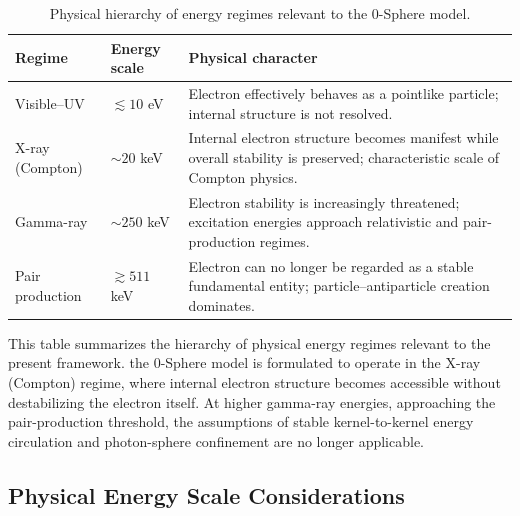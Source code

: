 \documentclass[%
 reprint,
 amsmath,amssymb,
 aps,
 prb,
]{revtex4-2}
\numberwithin{equation}{section}
\begin{document}
\begin{table}[t!]
\centering
\caption{Physical hierarchy of energy regimes relevant to the 0-Sphere model.}
\label{tab:energy_hierarchy}
\renewcommand{\arraystretch}{1.4}
\begin{tabular}{p{4.5cm}p{4.0cm}p{7.5cm}}
\toprule
\textbf{Regime} & \textbf{Energy scale} & \textbf{Physical character} \\
\midrule
Visible--UV
& $\lesssim 10$ eV
& Electron effectively behaves as a pointlike particle; internal structure is not resolved. \\
\addlinespace[0.25cm]

X-ray (Compton)
& $\sim 20$ keV
& Internal electron structure becomes manifest while overall stability is preserved; characteristic scale of Compton physics. \\
\addlinespace[0.25cm]

Gamma-ray
& $\sim 250$ keV
& Electron stability is increasingly threatened; excitation energies approach relativistic and pair-production regimes. \\
\addlinespace[0.25cm]

Pair production
& $\gtrsim 511$ keV
& Electron can no longer be regarded as a stable fundamental entity; particle--antiparticle creation dominates. \\
\bottomrule
\end{tabular}

\vspace{0.4em}
\begin{minipage}{0.95\textwidth}
\justifying\small
This table summarizes the hierarchy of physical energy regimes relevant to the present framework.
the 0-Sphere model is formulated to operate in the X-ray (Compton) regime, where internal electron structure becomes accessible without destabilizing the electron itself.
At higher gamma-ray energies, approaching the pair-production threshold, the assumptions of stable kernel-to-kernel energy circulation and photon-sphere confinement are no longer applicable.
\end{minipage}
\label{tab:energy_scale_hierarchy}
\end{table}


\subsection{Physical Energy Scale Considerations}
\end{document}
